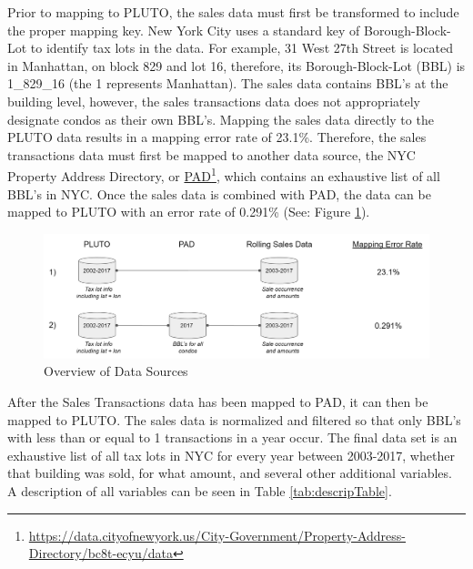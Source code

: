 \documentclass[12pt,]{article}
\let\rmarkdownfootnote\footnote%
\def\footnote{\protect\rmarkdownfootnote}
\begin{document}
Prior to mapping to PLUTO, the sales data must first be transformed to
include the proper mapping key. New York City uses a standard key of
Borough-Block-Lot to identify tax lots in the data. For example, 31 West
27th Street is located in Manhattan, on block 829 and lot 16, therefore,
its Borough-Block-Lot (BBL) is 1\_829\_16 (the 1 represents Manhattan).
The sales data contains BBL's at the building level, however, the sales
transactions data does not appropriately designate condos as their own
BBL's. Mapping the sales data directly to the PLUTO data results in a
mapping error rate of 23.1\%. Therefore, the sales transactions data
must first be mapped to another data source, the NYC Property Address
Directory, or
\href{https://data.cityofnewyork.us/City-Government/Property-Address-Directory/bc8t-ecyu/data}{PAD}\footnote{\url{https://data.cityofnewyork.us/City-Government/Property-Address-Directory/bc8t-ecyu/data}},
which contains an exhaustive list of all BBL's in NYC. Once the sales
data is combined with PAD, the data can be mapped to PLUTO with an error
rate of 0.291\% (See: Figure \ref{fig:Data Schema}).

\begin{figure}[h]
\includegraphics[width=1\linewidth]{Sections/tables and figures/Data Schema} \caption{Overview of Data Sources}\label{fig:Data Schema}
\end{figure}

After the Sales Transactions data has been mapped to PAD, it can then be
mapped to PLUTO. The sales data is normalized and filtered so that only
BBL's with less than or equal to 1 transactions in a year occur. The
final data set is an exhaustive list of all tax lots in NYC for every
year between 2003-2017, whether that building was sold, for what amount,
and several other additional variables. A description of all variables
can be seen in Table \ref{tab:descripTable}.
\end{document}
